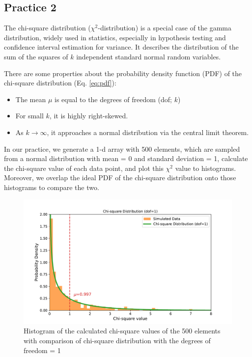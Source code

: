 \documentclass[12pt,a4paper]{article}
\begin{document}
\begin{CJK}{UTF8}{bkai}
\clearpage
\subsection{Practice 2}
\hfill

The chi-square distribution ($\chi^2$-distribution) is a special case of the gamma distribution, widely used in statistics, especially in hypothesis testing and confidence interval estimation for variance. It describes the distribution of the sum of the squares of $k$ independent standard normal random variables.

There are some properties about the probability density function (PDF) of the chi-square distribution (Eq. \ref{eq:pdf}):
\begin{itemize}
    \item The mean $\mu$ is equal to the degrees of freedom (dof; $k$)
    \item For small $k$, it is highly right-skewed.
    \item As $k\rightarrow\infty$, it approaches a normal distribution via the central limit theorem.
\end{itemize}

In our practice, we generate a 1-d array with 500 elements, which are sampled from a normal distribution with mean = 0 and standard deviation = 1, calculate the chi-square value of each data point, and plot this $\chi^2$ value to histograms. Moreover, we overlap the ideal PDF of the chi-square distribution onto those histograms to compare the two.


\begin{figure}[h]
    \centering
    \includegraphics[width=1\linewidth]{figures/output/output_2_1.pdf}
    \caption{Histogram of the calculated chi-square values of the 500 elements with comparison of chi-square distribution with the degrees of freedom = 1}
    \label{fig:output_2_1}
\end{figure}


\end{CJK}
\end{document}
